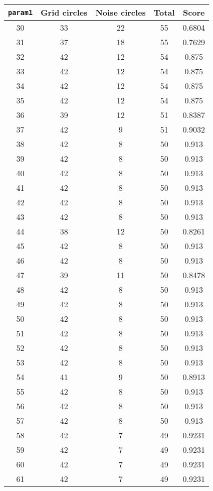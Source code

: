 \documentclass[letterpaper, 12pt]{article}
\begin{document}
\begin{longtable}{|c|c|c|c|c|}
\hline
\textbf{\texttt{param1}} & \textbf{Grid circles} & \textbf{Noise circles} & \textbf{Total} & \textbf{Score} \\
\hline
30 & 33 & 22 & 55 & 0.6804 \\
\hline
31 & 37 & 18 & 55 & 0.7629 \\
\hline
32 & 42 & 12 & 54 & 0.875 \\
\hline
33 & 42 & 12 & 54 & 0.875 \\
\hline
34 & 42 & 12 & 54 & 0.875 \\
\hline
35 & 42 & 12 & 54 & 0.875 \\
\hline
36 & 39 & 12 & 51 & 0.8387 \\
\hline
37 & 42 & 9 & 51 & 0.9032 \\
\hline
38 & 42 & 8 & 50 & 0.913 \\
\hline
39 & 42 & 8 & 50 & 0.913 \\
\hline
40 & 42 & 8 & 50 & 0.913 \\
\hline
41 & 42 & 8 & 50 & 0.913 \\
\hline
42 & 42 & 8 & 50 & 0.913 \\
\hline
43 & 42 & 8 & 50 & 0.913 \\
\hline
44 & 38 & 12 & 50 & 0.8261 \\
\hline
45 & 42 & 8 & 50 & 0.913 \\
\hline
46 & 42 & 8 & 50 & 0.913 \\
\hline
47 & 39 & 11 & 50 & 0.8478 \\
\hline
48 & 42 & 8 & 50 & 0.913 \\
\hline
49 & 42 & 8 & 50 & 0.913 \\
\hline
50 & 42 & 8 & 50 & 0.913 \\
\hline
51 & 42 & 8 & 50 & 0.913 \\
\hline
52 & 42 & 8 & 50 & 0.913 \\
\hline
53 & 42 & 8 & 50 & 0.913 \\
\hline
54 & 41 & 9 & 50 & 0.8913 \\
\hline
55 & 42 & 8 & 50 & 0.913 \\
\hline
56 & 42 & 8 & 50 & 0.913 \\
\hline
57 & 42 & 8 & 50 & 0.913 \\
\hline
58 & 42 & 7 & 49 & 0.9231 \\
\hline
59 & 42 & 7 & 49 & 0.9231 \\
\hline
60 & 42 & 7 & 49 & 0.9231 \\
\hline
61 & 42 & 7 & 49 & 0.9231 \\

\end{longtable}
\end{document}
